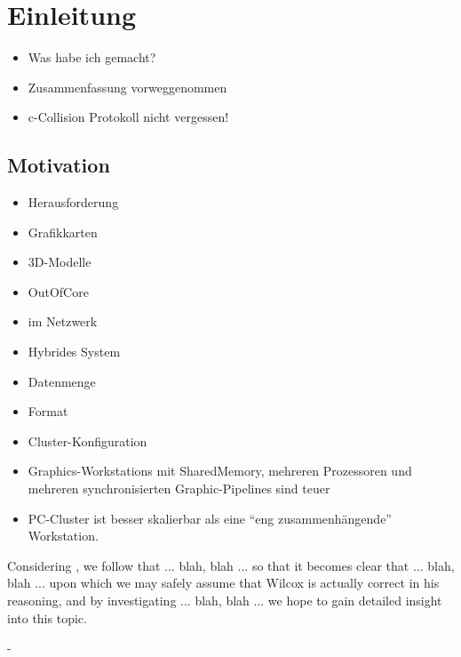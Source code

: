 %
%
%
%
%
%
%
%
%

\chapter{Einleitung}

\begin{itemize}
 \item Was habe ich gemacht?
 \item Zusammenfassung vorweggenommen
 \item c-Collision Protokoll nicht vergessen!
\end{itemize}

\section{Motivation}
\label{introduction:motivation}

\begin{itemize}
 \item Herausforderung
 \item Grafikkarten
 \item 3D-Modelle
 \item OutOfCore
 \item im Netzwerk
 \item Hybrides System
 \item Datenmenge
 \item Format
 \item Cluster-Konfiguration
 \item Graphics-Workstations mit SharedMemory, mehreren Prozessoren und mehreren synchronisierten Graphic-Pipelines sind teuer
 \item PC-Cluster ist besser skalierbar als eine ``eng zusammenhängende'' Workstation.

\end{itemize}

Considering \cite{gpugems2}, we follow that ... blah, blah ... so that it becomes
clear that ... blah, blah ... upon which we may safely assume that Wilcox is
actually correct in his reasoning, and by investigating ... blah, blah ...
we hope to gain detailed insight into this topic.

-


%
%
